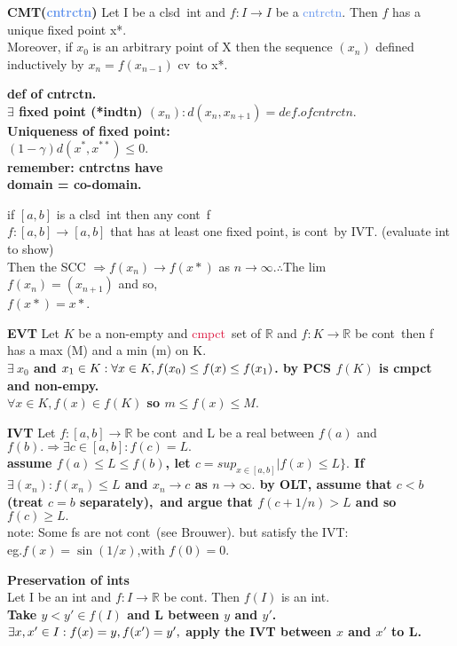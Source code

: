 \documentclass[10pt,landscape,a4paper]{article}
\def\line{

  \noindent{\color{mygray} \rule{\linewidth}{0.005mm}}

}
\def\R{\mathbb{R}}
\def\clsd{\textcolor{cyan(process)}{clsd}}
\def\cmpct{\textcolor{crimson}{cmpct}}
\def\cv{\textcolor{emerald}{cv}}
\def\cntrctn{\textcolor{cornflowerblue}{cntrctn}}
\def\cont{\textcolor{brickred}{cont}}
\newcommand\thm[1]{\line\textcolor{darklavender}{\bf#1}}
\newcommand\hint[1]{\textcolor{trolleygrey}{\bf#1}}
\begin{document}
\begin{multicols}{8}
\thm{CMT(\cntrctn)} Let I be a \clsd\ int and $f: I \to I$ be a 
\cntrctn. Then $f$ has a unique fixed point x*.
\\Moreover, if $x_0$ is an arbitrary point of X then the sequence $(x_n)$ defined inductively by $x_n = f(x_{n-1})$ \cv\ to x*.
\\\hint{def of cntrctn.\\
$\exists$ fixed point (*indtn) $(x_n): d(x_n,x_{n+1})  = def. of cntrctn.$\\
Uniqueness of  fixed point:\\ $(1-\gamma) d(x^* , x^{**}) \leq 0.$\\
remember: cntrctns have\\ domain = co-domain.
\line if $[a,b]$ is a \clsd\ int then any \cont\ f\\
$f: [a,b] \to [a,b]$ that has  at  least  one  fixed  point, is \cont\ by IVT. (evaluate int to show)
\\Then the SCC $\Rightarrow f(x_n) \to f(x*)$ as $n \to \infty. \therefore$The lim\\ $f(x_{n}) = (x_{n+1})$ and so, \\ $f(x*) = x*$. }

\thm{EVT} Let $K$ be a non-empty and \cmpct\ set of $\R$ and $f: K \to \R$ be \cont\ then f has a max (M) and a min (m) on K.
\\\hint{$\exists \ x_0$ and $x_1 \in K:\\ \forall x \in K, f(x_0) \leq f(x) \leq f(x_1)$.
by PCS $f(K)$ is cmpct and non-empy.\\
$\forall x \in K, f(x) \in f(K)$ so $m \leq f(x) \leq M.$} 

\thm{IVT} Let $ f:[a,b]\to \R$ be \cont\ and L be a real between $f(a)$ and $f(b). \Rightarrow \exists c \in [a,b]: f(c) = L.$
\\\hint{assume $f(a) \leq L\leq f(b)$, let $c = sup_{x \in [a,b]}| f(x) \leq L\}.$ If $\exists (x_n): f(x_n) \leq L$ and $x_n \to c$ as $n \to \infty.$ by OLT, assume that $c < b$ (treat $c = b$ separately),\ and argue that $f(c+1/n) > L$ and so $f(c)\geq L.$}
\\note: Some fs are not \cont\ (see Brouwer). but satisfy the IVT:\\ eg.$f(x) = \sin(1/x)$,with $f(0) = 0$.

\thm{Preservation of ints}\\Let I be an int and $f:I\to \R$ be \cont. Then $f(I)$ is an int.
\\\hint{Take $y<y' \in f(I)$ and L between $y$ and $y'$. $\exists x, x' \in I: \\f(x) = y, f(x') = y',$ apply the IVT between $x$ and $ x'$ to L.}


\end{multicols}
\end{document}
